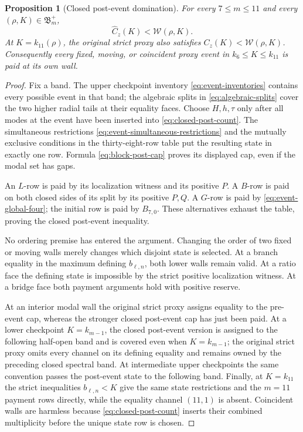 \documentclass[11pt]{article}
\newtheorem{proposition}[lemma]{Proposition}
\newcommand{\W}{\mathcal W}
\begin{document}
\begin{proposition}[Closed post-event domination]
\label{prop:closed-post-event-domination}
For every \(7\leq m\leq11\) and every
\((\rho,K)\in\mathfrak B_m^+\),
\[
 \widehat C_z(K)<\W(\rho,K).
\]
At \(K=k_{11}(\rho)\), the original strict proxy also satisfies
\(C_z(K)<\W(\rho,K)\).  Consequently every fixed, moving, or coincident
proxy event in \(k_6\leq K\leq k_{11}\) is paid at its own wall.
\end{proposition}

\begin{proof}
Fix a band.  The upper checkpoint inventory
\eqref{eq:event-inventories} contains every possible event in that band;
the algebraic splits in \eqref{eq:algebraic-splits} cover the two higher
radial tails at their equality faces.  Choose \(H,h,\tau\) only after all
modes at the event have been inserted into \eqref{eq:closed-post-count}.
The simultaneous restrictions
\eqref{eq:event-simultaneous-restrictions} and the mutually exclusive
conditions in the thirty-eight-row table put the resulting state in
exactly one row.  Formula \eqref{eq:block-post-cap} proves its displayed
cap, even if the modal set has gaps.

An \(L\)-row is paid by its localization witness and its positive \(P\).
A \(B\)-row is paid on both closed sides of its split by its positive
\(P,Q\).  A \(G\)-row is paid by \eqref{eq:event-global-four}; the initial
row is paid by \(B_{7,0}\).  These alternatives exhaust the table, proving
the closed post-event inequality.

No ordering premise has entered the argument.  Changing the order of two
fixed or moving walls merely changes which disjoint state is selected.
At a branch equality in the maximum defining \(b_{\ell,n}\), both lower
walls remain valid.  At a ratio face the defining state is impossible by
the strict positive localization witness.  At a bridge face both payment
arguments hold with positive reserve.

At an interior modal wall the original strict proxy assigns equality to
the pre-event cap, whereas the stronger closed post-event cap has just
been paid.  At a lower checkpoint \(K=k_{m-1}\), the closed post-event
version is assigned to the following half-open band and is covered even
when \(K=k_{m-1}\); the original strict proxy omits every channel on its
defining equality and remains owned by the preceding closed spectral
band.  At intermediate upper checkpoints the same convention passes the
post-event state to the following band.  Finally, at \(K=k_{11}\) the
strict inequalities \(b_{\ell,n}<K\) give the same state restrictions and
the \(m=11\) payment rows directly, while the equality channel
\((11,1)\) is absent.  Coincident walls are harmless because
\eqref{eq:closed-post-count} inserts their combined multiplicity before
the unique state row is chosen.
\end{proof}
\end{document}
